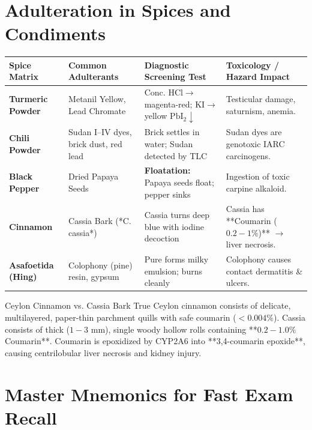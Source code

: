 \documentclass[10pt,a4paper,oneside]{article}
\begin{document}
\section{Adulteration in Spices and Condiments}

\begin{center}
\small
\begin{tabular}{@{}p{3.0cm} p{4.0cm} p{4.5cm} p{5.5cm}@{}}
\toprule
\textbf{Spice Matrix} & \textbf{Common Adulterants} & \textbf{Diagnostic Screening Test} & \textbf{Toxicology / Hazard Impact} \tabularnewline
\midrule
\textbf{Turmeric Powder} & Metanil Yellow, Lead Chromate & Conc. $\mathrm{HCl} \rightarrow$ magenta-red; $\mathrm{KI} \rightarrow$ yellow $\mathrm{PbI_2}\downarrow$ & Testicular damage, saturnism, anemia. \tabularnewline
\textbf{Chili Powder} & Sudan I--IV dyes, brick dust, red lead & Brick settles in water; Sudan detected by TLC & Sudan dyes are genotoxic IARC carcinogens. \tabularnewline
\textbf{Black Pepper} & Dried Papaya Seeds & \textbf{Floatation:} Papaya seeds float; pepper sinks & Ingestion of toxic carpine alkaloid. \tabularnewline
\textbf{Cinnamon} & Cassia Bark (*C. cassia*) & Cassia turns deep blue with iodine decoction & Cassia has **Coumarin ($0.2-1\%$)** $\rightarrow$ liver necrosis. \tabularnewline
\textbf{Asafoetida (Hing)} & Colophony (pine) resin, gypsum & Pure forms milky emulsion; burns cleanly & Colophony causes contact dermatitis \& ulcers. \tabularnewline
\bottomrule
\end{tabular}
\end{center}

\begin{mechanismbox}{Ceylon Cinnamon vs. Cassia Bark}
True Ceylon cinnamon consists of delicate, multilayered, paper-thin parchment quills with safe coumarin ($<0.004\%$). Cassia consists of thick ($1-3\text{ mm}$), single woody hollow rolls containing **$0.2-1.0\%$ Coumarin**. Coumarin is epoxidized by CYP2A6 into **3,4-coumarin epoxide**, causing centrilobular liver necrosis and kidney injury.
\end{mechanismbox}

\newpage

\section{Master Mnemonics for Fast Exam Recall}
\end{document}
